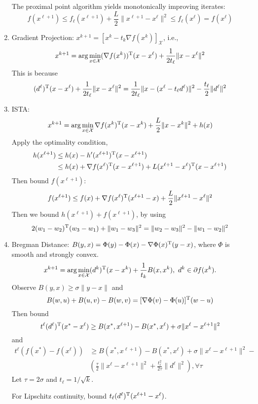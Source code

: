 \begin{enumerate}
The proximal point algorithm yields monotonically improving iterates:
\[
f(x^{\ell+1})\le f_{\ell}(x^{\ell+1})+\frac{L}{2}\|x^{\ell+1}-x^{\ell}\|^2\le f_\ell(x^\ell)=f(x^\ell)
\]
\item
Gradient Projection: $x^{k+1} = [x^k - t_k\nabla f(x^k)]_{\mathcal{X}}$, i.e., 
\[
x^{k+1} = \arg\min_{x\in\mathcal{X}}(\nabla f(x^k))^{\mathrm T}(x-x^{\ell})+\frac{1}{2t_\ell}\|x-x^\ell\|^2
\]
This is because
\[
(d^{\ell})^{\mathrm T}(x-x^{\ell})+\frac{1}{2t_\ell}\|x-x^\ell\|^2=\frac{1}{2t_\ell}\|x-(x^\ell-t_\ell d^\ell)\|^2 - \frac{t_\ell}{2}\|d^\ell\|^2
\]
\item
ISTA: 
\[
x^{k+1} = \arg\min_{x\in\mathcal{X}}\nabla f(x^k)^{\mathrm T}(x-x^k)+\frac{L}{2}\|x-x^k\|^2+h(x)
\]
Apply the optimality condition,
\begin{align*}
h(x^{\ell+1})&\le h(x)-h'(x^{\ell+1})^{\mathrm T}(x-x^{\ell+1})\\
&\le h(x)+\nabla f(x^{\ell})^{\mathrm T}(x-x^{\ell+1})+L(x^{\ell+1}-x^{\ell})^{\mathrm T}(x-x^{\ell+1})
\end{align*}
Then bound $f(x^{\ell+1})$:
\[
f(x^{\ell+1})\le f(x)+\nabla f(x^{\ell})^{\mathrm T}(x^{\ell+1}-x)+\frac{L}{2}\|x^{\ell+1}-x^\ell\|^2
\]
Then we bound $h(x^{\ell+1})+f(x^{\ell+1})$, by using
\[
2(w_1-w_2)^{\mathrm T}(w_3-w_1)+\|w_1-w_3\|^2=\|w_2-w_3\|^2-\|w_1-w_2\|^2
\]
\item
Bregman Distance: $B(y,x) = \Phi(y)-\Phi(x)-\nabla\Phi(x)^{\mathrm T}(y-x)$, where $\Phi$ is smooth and strongly convex.
\[
x^{k+1} = \arg\min_{x\in\mathcal{X}}(d^k)\trans(x-x^k)+\frac{1}{t_k}B(x,x^k),\ d^k\in\partial f(x^k).
\]
Observe $B(y,x)\ge\sigma\|y-x\|$ and
\[
B(w,u)+B(u,v)-B(w,v)=[\nabla \Phi(v) - \Phi(u)]^{\mathrm T}(w-u)
\]
Then bound
\[
t^{\ell}(d^{\ell})^{\mathrm T}(x^*-x^{\ell})\ge B(x^*,x^{\ell+1}) - B(x^*,x^{\ell})+\sigma\|x^\ell-x^{\ell+1}\|^2
\]
and
\begin{align*}
t^{\ell}(f(x^*)-f(x^{\ell}))&\ge B(x^*,x^{\ell+1}) - B(x^*,x^{\ell})+\sigma\|x^\ell-x^{\ell+1}\|^2 - \\&\left(
\frac{\tau}{2}\|x^\ell-x^{\ell+1}\|^2+\frac{t_\ell^2}{2\tau}\|d^\ell\|^2
\right)
,\forall\tau
\end{align*}
Let $\tau=2\sigma$ and $t_\ell=1/\sqrt{k}$.

For Lipschitz continuity, bound $t_\ell(d^{\ell})^{\mathrm T}(x^{\ell+1}-x^\ell)$.
\end{enumerate}





























